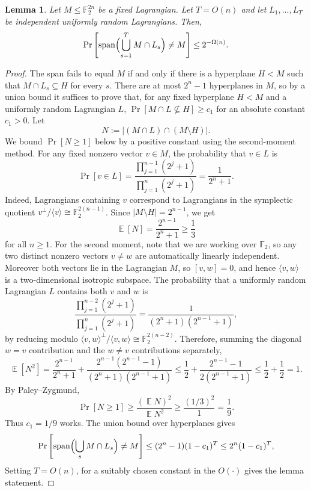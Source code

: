 \documentclass[11pt]{article}
\newtheorem{lemma}[theorem]{Lemma}
\newcommand{\E}{\mathop{\mathbb{E}}}
\newcommand{\F}{\mathbb{F}}
\begin{document}
\begin{lemma}
\label{lem:random-basis-spans-signs}
Let $M\le\F_2^{2n}$ be a fixed Lagrangian. Let $T=O(n)$ and let
$L_1,\ldots,L_T$ be independent uniformly random Lagrangians.  Then,
$$
    \Pr\left[
        \operatorname{span}\Bigl(\bigcup_{s=1}^T M\cap L_s\Bigr)\ne M
    \right]
    \le
2^{-\Omega(n)}.
$$
\end{lemma}

\begin{proof}
The span fails to equal $M$ if and only if there is a hyperplane
$H<M$ such that
$  M\cap L_s\subseteq H$ 
for every $s$.  There are at most $2^n-1$ hyperplanes in $M$, so by a
union bound it suffices to prove that, for any fixed hyperplane $H<M$ and a
uniformly random Lagrangian $L$,
$   \Pr[M\cap L\not\subseteq H]\ge c_1$  
for an absolute constant $c_1>0$. 
Let
$$
    N:=\left|(M\cap L)\cap(M\setminus H)\right|.
$$
We bound $\Pr[N\ge1]$ below by a positive constant using the second-moment
method. 
For any fixed nonzero vector $v\in M$, the probability that $v\in L$ is
$$
    \Pr[v\in L]
    =
    \frac{\prod_{j=1}^{n-1}(2^j+1)}
         {\prod_{j=1}^{n}(2^j+1)}
    =
    \frac{1}{2^n+1}.
$$
Indeed, Lagrangians containing $v$ correspond to Lagrangians in the symplectic
quotient $v^\perp/\langle v\rangle\cong\F_2^{2(n-1)}$.  Since
$|M\setminus H|=2^{n-1}$, we get
$$
    \E[ N]
    =
    \frac{2^{n-1}}{2^n+1}
    \ge \frac13
$$
for all $n\ge1$. 
For the second moment, note that we are working over $\F_2$, so any two
distinct nonzero vectors $v\ne w$ are automatically linearly independent.
Moreover both vectors lie in the Lagrangian $M$, so $[v,w]=0$, and hence
$\langle v,w\rangle$ is a two-dimensional isotropic subspace.  The
probability that a uniformly random Lagrangian $L$ contains both $v$ and
$w$ is
$$
    \frac{\prod_{j=1}^{n-2}(2^j+1)}
         {\prod_{j=1}^{n}(2^j+1)}
    =
    \frac{1}{(2^n+1)(2^{n-1}+1)},
$$
by reducing modulo $\langle v,w\rangle^\perp/\langle v,w\rangle\cong
\F_2^{2(n-2)}$.  Therefore, summing the diagonal $w=v$ contribution and the
$w\ne v$ contributions separately,
$$
    \E [N^2]
    =
    \frac{2^{n-1}}{2^n+1}
    +
    \frac{2^{n-1}(2^{n-1}-1)}
         {(2^n+1)(2^{n-1}+1)}
    \le
    \frac12+\frac{2^{n-1}-1}{2(2^{n-1}+1)}
    \le
    \frac12+\frac12=1.
$$
By Paley--Zygmund,
$$
    \Pr[N\ge1]\ge \frac{(\E N)^2}{\E N^2}\ge \frac{(1/3)^2}{1}=\frac19.
$$
Thus $c_1=1/9$ works.  The union bound over hyperplanes gives
$$
    \Pr\left[
        \operatorname{span}\Bigl(\bigcup_s M\cap L_s\Bigr)\ne M
    \right]
    \le
    (2^n-1)(1-c_1)^T
    \le
    2^n(1-c_1)^T,
$$
Setting $T=O(n)$, for a suitably chosen constant in the $O(\cdot)$ gives the lemma statement.
\end{proof}
\end{document}
